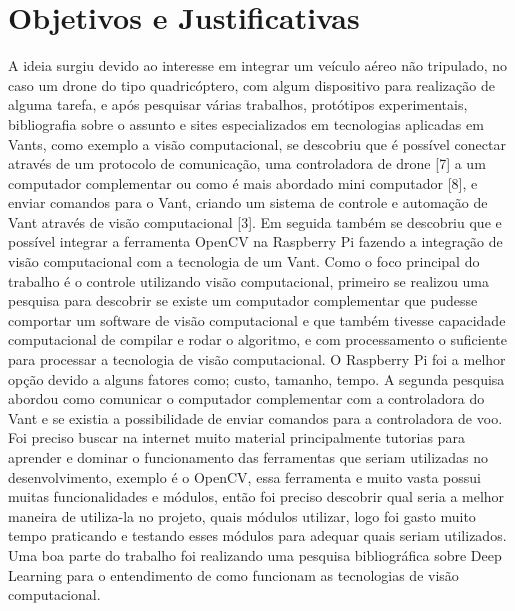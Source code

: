 \chapter{Objetivos e Justificativas}\label{cap:objJust}
A ideia surgiu devido ao interesse em integrar um veículo aéreo não tripulado, no caso um drone do tipo quadricóptero, com algum dispositivo para realização de alguma tarefa, e após pesquisar várias trabalhos, protótipos experimentais, bibliografia sobre o assunto e sites especializados em tecnologias aplicadas em Vants, como exemplo a visão computacional, se descobriu que é possível conectar através de um protocolo de comunicação, uma controladora de drone [7] a um computador complementar ou como é mais abordado mini computador [8], e enviar comandos para o Vant, criando um sistema de controle e automação de Vant através de visão computacional [3]. Em seguida também se descobriu que e possível integrar a ferramenta OpenCV na Raspberry Pi fazendo a integração de visão computacional com a tecnologia de um Vant.
Como o foco principal do trabalho é o controle utilizando visão computacional, primeiro se realizou uma pesquisa para descobrir se existe um computador complementar que pudesse comportar um software de visão computacional e que também tivesse capacidade computacional de compilar e rodar o algoritmo, e com processamento o suficiente para processar a tecnologia de visão computacional.
O Raspberry Pi foi a melhor opção devido a alguns fatores como; custo, tamanho, tempo.
A segunda pesquisa abordou como comunicar o computador complementar com a controladora do Vant e se existia a possibilidade de enviar comandos para a controladora de voo. 
Foi preciso buscar na internet muito material principalmente tutorias para aprender e dominar o funcionamento das ferramentas que seriam utilizadas no desenvolvimento, exemplo é o OpenCV, essa ferramenta e muito vasta possui muitas funcionalidades e módulos, então foi preciso descobrir qual seria a melhor maneira de utiliza-la no projeto, quais módulos utilizar, logo foi gasto muito tempo praticando e testando esses módulos para adequar quais seriam utilizados.  
Uma boa parte do trabalho foi realizando uma pesquisa bibliográfica sobre Deep Learning para o entendimento de como funcionam as tecnologias de visão computacional.

